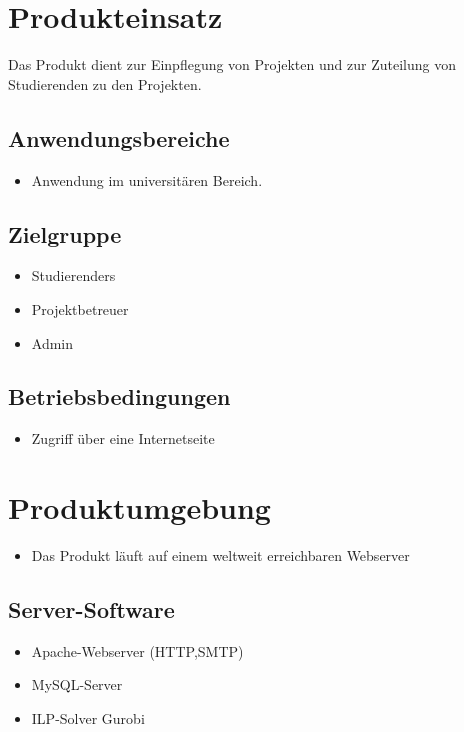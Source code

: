 \documentclass[parskip=full]{scrartcl}
\begin{document}
\section{Produkteinsatz}
Das Produkt dient zur Einpflegung von Projekten und zur Zuteilung von
Studierenden zu den Projekten.


\subsection{Anwendungsbereiche}

\begin{itemize} 
  \item Anwendung im universitären Bereich. %
\end{itemize}

\subsection{Zielgruppe}
\begin{itemize} 
  \item \glspl{Studierender}
  \item \gls{Projektbetreuer}
  \item \gls{Admin}
\end{itemize}

\subsection{Betriebsbedingungen}
\begin{itemize} 
  \item Zugriff über eine Internetseite
\end{itemize}
\section{Produktumgebung}
\begin{itemize} 
  \item Das Produkt läuft auf einem weltweit erreichbaren Webserver
\end{itemize}
\subsection{Server-Software}
\begin{itemize} 
  \item Apache-Webserver (HTTP,SMTP)
  \item MySQL-Server
  \item ILP-Solver Gurobi %
\end{itemize}
\end{document}
